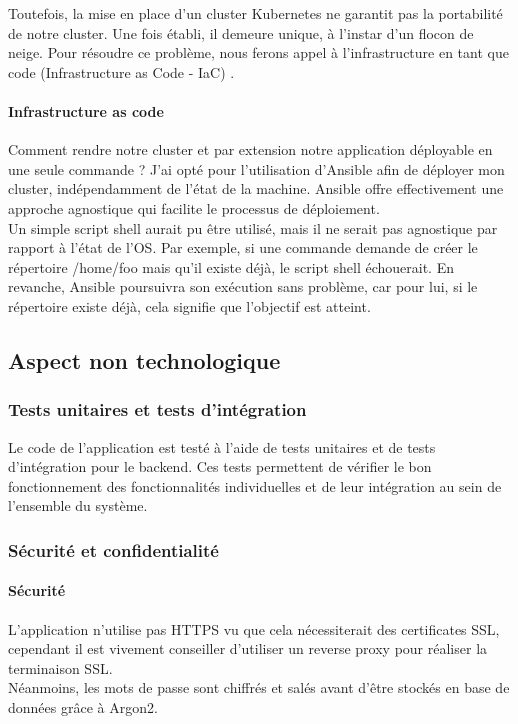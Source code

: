 Toutefois, la mise en place d'un cluster Kubernetes ne garantit pas la portabilité de notre cluster.
Une fois établi, il demeure unique, à l'instar d'un flocon de neige.
Pour résoudre ce problème, nous ferons appel à l'infrastructure en tant que code (Infrastructure as Code - IaC) .

\paragraph{Infrastructure as code}
Comment rendre notre cluster et par extension notre application déployable en une seule commande ?
J'ai opté pour l'utilisation d'Ansible afin de déployer mon cluster, indépendamment de l'état de la machine.
Ansible offre effectivement une approche agnostique qui facilite le processus de déploiement.\\

Un simple script shell aurait pu être utilisé, mais il ne serait pas agnostique par rapport à l'état de l'OS\@.
Par exemple, si une commande demande de créer le répertoire /home/foo mais qu'il existe déjà, le script shell échouerait.
En revanche, Ansible poursuivra son exécution sans problème, car pour lui, si le répertoire existe déjà, cela signifie que l'objectif est atteint.\\

\subsection{Aspect non technologique}\label{subsec:aspect-non-technologique}

\subsubsection{Tests unitaires et tests d'intégration}

Le code de l'application est testé à l'aide de tests unitaires et de tests d'intégration pour le backend.
Ces tests permettent de vérifier le bon fonctionnement des fonctionnalités individuelles et de leur intégration au sein de l'ensemble du système.

\subsubsection{Sécurité et confidentialité}

\paragraph{Sécurité}
L'application n'utilise pas HTTPS vu que cela nécessiterait des certificates SSL, cependant il est vivement conseiller d'utiliser un reverse proxy pour réaliser la terminaison SSL.\\
Néanmoins, les mots de passe sont chiffrés et salés avant d'être stockés en base de données grâce à Argon2.\\

